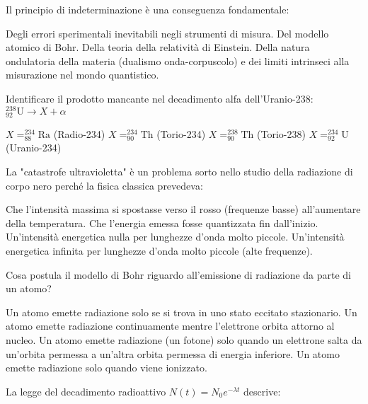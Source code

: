 \documentclass{exam}%
\begin{document}
\begin{questions}
\begin{choices}
\end{choices}%
\question Il principio di indeterminazione è una conseguenza fondamentale:%
\vspace{0.2em}%
\begin{choices}%
\choice Degli errori sperimentali inevitabili negli strumenti di misura.%
\choice Del modello atomico di Bohr.%
\choice Della teoria della relatività di Einstein.%
\choice Della natura ondulatoria della materia (dualismo onda-corpuscolo) e dei limiti intrinseci alla misurazione nel mondo quantistico.%
\end{choices}%
\question Identificare il prodotto mancante nel decadimento alfa dell'Uranio-238: $^{238}_{92}\text{U} \rightarrow X + \alpha$%
\vspace{0.2em}%
\begin{multicols}{4}%
\begin{choices}%
\choice $X = ^{234}_{88}\text{Ra}$ (Radio-234)%
\choice $X = ^{234}_{90}\text{Th}$ (Torio-234)%
\choice $X = ^{238}_{90}\text{Th}$ (Torio-238)%
\choice $X = ^{234}_{92}\text{U}$ (Uranio-234)%
\end{choices}%
\end{multicols}%
\question La "catastrofe ultravioletta" è un problema sorto nello studio della radiazione di corpo nero perché la fisica classica prevedeva:%
\vspace{0.2em}%
\begin{choices}%
\choice Che l'intensità massima si spostasse verso il rosso (frequenze basse) all'aumentare della temperatura.%
\choice Che l'energia emessa fosse quantizzata fin dall'inizio.%
\choice Un'intensità energetica nulla per lunghezze d'onda molto piccole.%
\choice Un'intensità energetica infinita per lunghezze d'onda molto piccole (alte frequenze).%
\end{choices}%
\question Cosa postula il modello di Bohr riguardo all'emissione di radiazione da parte di un atomo?%
\vspace{0.2em}%
\begin{choices}%
\choice Un atomo emette radiazione solo se si trova in uno stato eccitato stazionario.%
\choice Un atomo emette radiazione continuamente mentre l'elettrone orbita attorno al nucleo.%
\choice Un atomo emette radiazione (un fotone) solo quando un elettrone salta da un'orbita permessa a un'altra orbita permessa di energia inferiore.%
\choice Un atomo emette radiazione solo quando viene ionizzato.%
\end{choices}%
\question La legge del decadimento radioattivo $N(t) = N_0 e^{-\lambda t}$ descrive:%

\end{questions}
\end{document}
